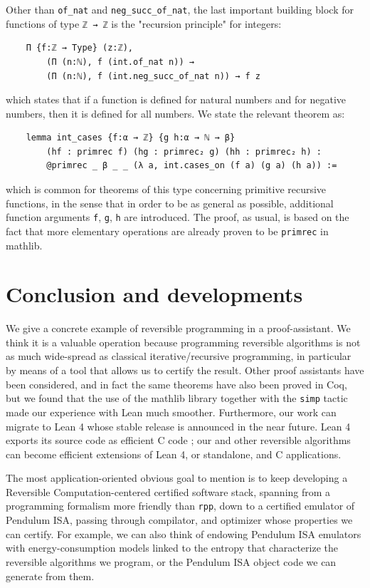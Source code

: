 \documentclass[preprint]{elsarticle}
\theoremstyle{remark}
\newcommand{\CPP}{\textsf{C}\xspace}
\newcommand{\MATHLIB}{\textsf{mathlib}\xspace}
\newcommand{\LEAN}{\textsf{Lean}\xspace}
\newcommand{\COQ}{\textsf{Coq}\xspace}
\newcommand{\LEANFour}{\textsf{Lean 4}\xspace}
\newcommand{\PISA}{\textsf{Pendulum ISA}\xspace}
\begin{document}
Other than \lstinline|of_nat| and \lstinline|neg_succ_of_nat|, the last important building block for functions of type \lstinline|ℤ → ℤ| is the "recursion principle" for integers:
\begin{lstlisting}
    Π {f:ℤ → Type} (z:ℤ),
        (Π (n:ℕ), f (int.of_nat n)) →
        (Π (n:ℕ), f (int.neg_succ_of_nat n)) → f z
\end{lstlisting}
\noindent
which states that if a function is defined for natural numbers and for negative numbers, then it is defined for all numbers. We state the relevant theorem as:
\begin{lstlisting}
    lemma int_cases {f:α → ℤ} {g h:α → ℕ → β}
        (hf : primrec f) (hg : primrec₂ g) (hh : primrec₂ h) :
        @primrec _ β _ _ (λ a, int.cases_on (f a) (g a) (h a)) :=
\end{lstlisting}
\noindent
which is common for theorems of this type concerning primitive recursive functions, in the sense that in order to be as general as possible, additional function arguments \lstinline|f|, \lstinline|g|, \lstinline|h| are introduced. The proof, as usual, is based on the fact that more elementary operations are already proven to be \lstinline|primrec| in \MATHLIB.

\section{Conclusion and developments}
\label{section:Conclusion and developments}
We give a concrete example of reversible programming in a proof-assistant. We think it is a valuable operation because programming reversible algorithms is not as much wide-spread as classical iterative/recursive programming, in particular by means of a tool that allows us to certify the result.
Other proof assistants have been considered, and in fact the same theorems have also been proved in \COQ, but we found that the use of the \MATHLIB library together with the \lstinline|simp| tactic made our experience with \LEAN much smoother.
Furthermore, our work can migrate to \LEANFour whose stable release is announced in the near future. \LEANFour exports its source code as efficient \CPP code \cite{2021-LEAN4-MouraUllrich}; our and other reversible algorithms can become efficient extensions of \LEANFour, or standalone, and \CPP applications.

The most application-oriented obvious goal to mention is to keep developing a Reversible Computa\-tion-centered certified software stack, spanning from a programming formalism more friendly than \lstinline|rpp|, down to a certified emulator of \PISA, passing through compilator, and optimizer whose properties we can certify. For example, we can also think of endowing \PISA emulators with energy-consumption models linked to the entropy that characterize the reversible algorithms we program, or the \PISA object code we can generate from them.
\end{document}

